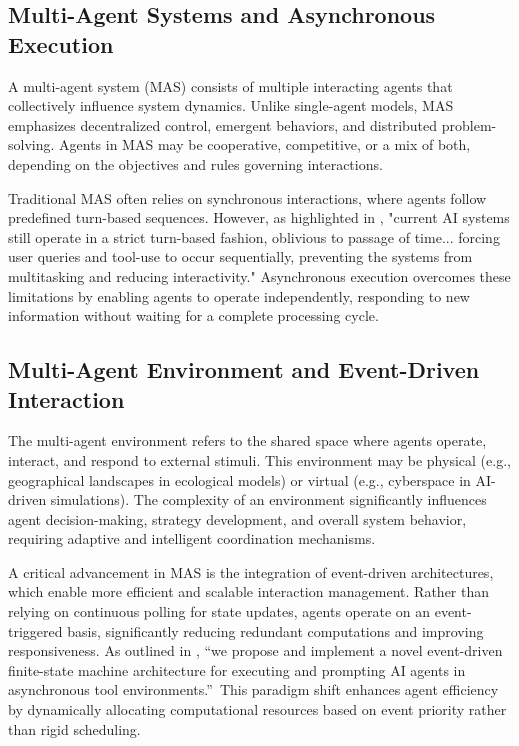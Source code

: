 \subsection{Multi-Agent Systems and Asynchronous Execution}

A multi-agent system (MAS) consists of multiple interacting agents that collectively influence system dynamics. Unlike single-agent models, MAS emphasizes decentralized control, emergent behaviors, and distributed problem-solving. Agents in MAS may be cooperative, competitive, or a mix of both, depending on the objectives and rules governing interactions.

Traditional MAS often relies on synchronous interactions, where agents follow predefined turn-based sequences. However, as highlighted in \cite{ginart2024}, "current AI systems still operate in a strict turn-based fashion, oblivious to passage of time... forcing user queries and tool-use to occur sequentially, preventing the systems from multitasking and reducing interactivity." Asynchronous execution overcomes these limitations by enabling agents to operate independently, responding to new information without waiting for a complete processing cycle.

\subsection{Multi-Agent Environment and Event-Driven Interaction}

The multi-agent environment refers to the shared space where agents operate, interact, and respond to external stimuli. This environment may be physical (e.g., geographical landscapes in ecological models) or virtual (e.g., cyberspace in AI-driven simulations). The complexity of an environment significantly influences agent decision-making, strategy development, and overall system behavior, requiring adaptive and intelligent coordination mechanisms.

A critical advancement in MAS is the integration of event-driven architectures, which enable more efficient and scalable interaction management. Rather than relying on continuous polling for state updates, agents operate on an event-triggered basis, significantly reducing redundant computations and improving responsiveness. As outlined in \cite{ginart2024}, \textquotedblleft we propose and implement a novel event-driven finite-state machine architecture for executing and prompting AI agents in asynchronous tool environments.\textquotedblright\ This paradigm shift enhances agent efficiency by dynamically allocating computational resources based on event priority rather than rigid scheduling.

